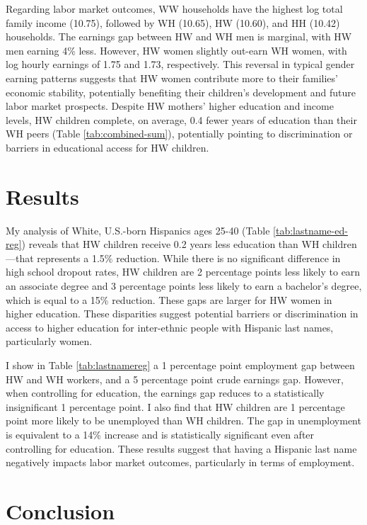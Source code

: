 \documentclass[a4paper,fleqn]{cas-sc}
\begin{document}
Regarding labor market outcomes, WW households have the highest log total family income (10.75), followed by WH (10.65), HW (10.60), and HH (10.42) households. The earnings gap between HW and WH men is marginal, with HW men earning 4\% less. However, HW women slightly out-earn WH women, with log hourly earnings of 1.75 and 1.73, respectively. This reversal in typical gender earning patterns suggests that HW women contribute more to their families' economic stability, potentially benefiting their children's development and future labor market prospects. Despite HW mothers' higher education and income levels, HW children complete, on average, 0.4 fewer years of education than their WH peers (Table \ref{tab:combined-sum}), potentially pointing to discrimination or barriers in educational access for HW children.

\section{Results}\label{sec:results}

My analysis of White, U.S.-born Hispanics ages 25-40 (Table \ref{tab:lastname-ed-reg}) reveals that HW children receive 0.2 years less education than WH children---that represents a 1.5\% reduction. While there is no significant difference in high school dropout rates, HW children are 2 percentage points less likely to earn an associate degree and 3 percentage points less likely to earn a bachelor's degree, which is equal to a 15\% reduction. These gaps are larger for HW women in higher education. These disparities suggest potential barriers or discrimination in access to higher education for inter-ethnic people with Hispanic last names, particularly women.

I show in Table \ref{tab:lastnamereg} a 1 percentage point employment gap between HW and WH workers, and a 5 percentage point crude earnings gap. However, when controlling for education, the earnings gap reduces to a statistically insignificant 1 percentage point. I also find that HW children are 1 percentage point more likely to be unemployed than WH children. The gap in unemployment is equivalent to a 14\% increase and is statistically significant even after controlling for education. These results suggest that having a Hispanic last name negatively impacts labor market outcomes, particularly in terms of employment.

\section{Conclusion}\label{sec:con1}
\end{document}
